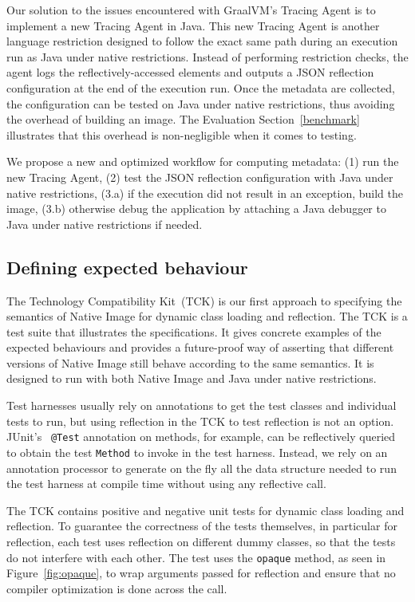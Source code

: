 Our solution to the issues encountered with GraalVM's Tracing Agent is to implement a new Tracing Agent in Java. This new Tracing Agent is another language restriction designed to follow the exact same path during an execution run as Java under native restrictions. Instead of performing restriction checks, the agent logs the reflectively-accessed elements and outputs a JSON reflection configuration at the end of the execution run. 
Once the metadata are collected, the configuration can be tested on Java under native restrictions, thus avoiding the overhead of building an image. The Evaluation Section~\ref{benchmark} illustrates that this overhead is non-negligible when it comes to testing.  

We propose a new and optimized workflow for computing metadata: (1) run the new Tracing Agent, (2) test the JSON reflection configuration with Java under native restrictions, (3.a) if the execution did not result in an exception, build the image, (3.b) otherwise debug the application by attaching a Java debugger to Java under native restrictions if needed.

\subsection{Defining expected behaviour}
The Technology Compatibility Kit~(TCK) is our first approach to specifying the semantics of Native Image for dynamic class loading and reflection. The TCK is a test suite that illustrates the specifications. It gives concrete examples of the expected behaviours and provides a future-proof way of asserting that different versions of Native Image still behave according to the same semantics.
It is designed to run with both Native Image and Java under native restrictions.

Test harnesses usually rely on annotations to get the test classes and individual tests to run, but using reflection in the TCK to test reflection is not an option. JUnit's~\cite{noauthor_junit_nodate} \verb|@Test| annotation on methods, for example, can be reflectively queried to obtain the test \verb|Method| to invoke in the test harness. Instead, we rely on an annotation processor to generate on the fly all the data structure needed to run the test harness at compile time without using any reflective call.

The TCK contains positive and negative unit tests for dynamic class loading and reflection. To guarantee the correctness of the tests themselves, in particular for reflection, each test uses reflection on different dummy classes, so that the tests do not interfere with each other.
The test uses the \verb|opaque| method, as seen in Figure~\ref{fig:opaque}, to wrap arguments passed for reflection and ensure that no compiler optimization is done across the call.

